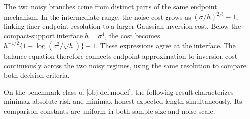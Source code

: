The two noisy branches come from distinct parts of the same endpoint mechanism. In the intermediate range, the noise cost grows as \((\sigma/h)^{2/3}-1\), linking finer endpoint resolution to a larger Gaussian inversion cost. Below the compact-support interface \(h=\sigma^4\), the cost becomes \(h^{-1/2}\{1+\log(\sigma^2/\sqrt h)\}-1\). These expressions agree at the interface. The balance equation therefore connects endpoint approximation to inversion cost continuously across the two noisy regimes, using the same resolution to compare both decision criteria.

On the benchmark class of \cref{obj:def:model}, the following result characterizes minimax absolute risk and minimax honest expected length simultaneously. Its comparison constants are uniform in both sample size and noise scale.

